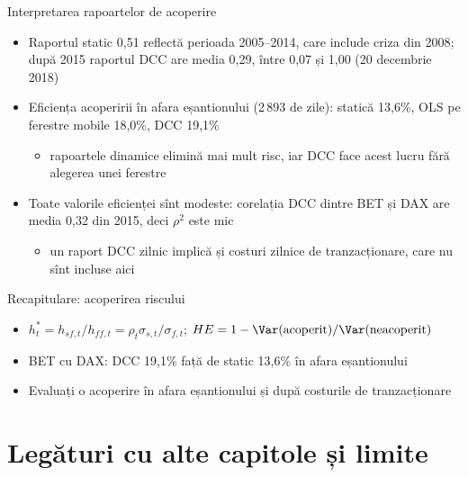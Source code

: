 \begin{frame}{Interpretarea rapoartelor de acoperire}
\itemsize{\small}
\begin{itemize}
    \item Raportul static 0{,}51 reflectă perioada 2005--2014, care include criza din 2008; după 2015 raportul DCC are media 0{,}29, între 0{,}07 și 1{,}00 (20 decembrie 2018)
    \item Eficiența acoperirii în afara eșantionului (2\,893 de zile): statică 13{,}6\%, OLS pe ferestre mobile 18{,}0\%, DCC 19{,}1\%
    \begin{itemize}
        \item rapoartele dinamice elimină mai mult risc, iar DCC face acest lucru fără alegerea unei ferestre
    \end{itemize}
    \item Toate valorile eficienței sînt modeste: corelația DCC dintre BET și DAX are media 0{,}32 din 2015, deci $\rho^2$ este mic
    \begin{itemize}
        \item un raport DCC zilnic implică și costuri zilnice de tranzacționare, care nu sînt incluse aici
    \end{itemize}
\end{itemize}
\end{frame}

\begin{frame}{Recapitulare: acoperirea riscului}
\itemsize{\small}
\begin{itemize}
    \item $h_t^* = h_{sf,t}/h_{ff,t} = \rho_t\sigma_{s,t}/\sigma_{f,t}$; $HE = 1 - \Var(\text{acoperit})/\Var(\text{neacoperit})$
    \item BET cu DAX: DCC 19{,}1\% față de static 13{,}6\% în afara eșantionului
    \item Evaluați o acoperire în afara eșantionului și după costurile de tranzacționare
\end{itemize}
\end{frame}


\section{Legături cu alte capitole și limite}

